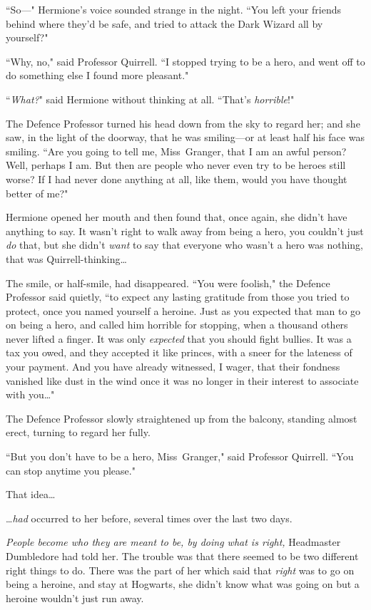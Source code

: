 ``So—" Hermione's voice sounded strange in the night. ``You left your friends behind where they'd be safe, and tried to attack the Dark Wizard all by yourself?"

``Why, no," said Professor Quirrell. ``I stopped trying to be a hero, and went off to do something else I found more pleasant."

``\emph{What?}" said Hermione without thinking at all. ``That's \emph{horrible}!"

The Defence Professor turned his head down from the sky to regard her; and she saw, in the light of the doorway, that he was smiling—or at least half his face was smiling. ``Are you going to tell me, Miss~Granger, that I am an awful person? Well, perhaps I am. But then are people who never even try to be heroes still worse? If I had never done anything at all, like them, would you have thought better of me?"

Hermione opened her mouth and then found that, once again, she didn't have anything to say. It wasn't right to walk away from being a hero, you couldn't just \emph{do} that, but she didn't \emph{want} to say that everyone who wasn't a hero was nothing, that was Quirrell-thinking{\ldots}

The smile, or half-smile, had disappeared. ``You were foolish," the Defence Professor said quietly, ``to expect any lasting gratitude from those you tried to protect, once you named yourself a heroine. Just as you expected that man to go on being a hero, and called him horrible for stopping, when a thousand others never lifted a finger. It was only \emph{expected} that you should fight bullies. It was a tax you owed, and they accepted it like princes, with a sneer for the lateness of your payment. And you have already witnessed, I wager, that their fondness vanished like dust in the wind once it was no longer in their interest to associate with you{\ldots}"

The Defence Professor slowly straightened up from the balcony, standing almost erect, turning to regard her fully.

``But you don't have to be a hero, Miss~Granger," said Professor Quirrell. ``You can stop anytime you please."

That idea{\ldots}

{\ldots}\emph{had} occurred to her before, several times over the last two days.

\emph{People become who they are meant to be, by doing what is right,} Headmaster Dumbledore had told her. The trouble was that there seemed to be two different right things to do. There was the part of her which said that \emph{right} was to go on being a heroine, and stay at Hogwarts, she didn't know what was going on but a heroine wouldn't just run away.

